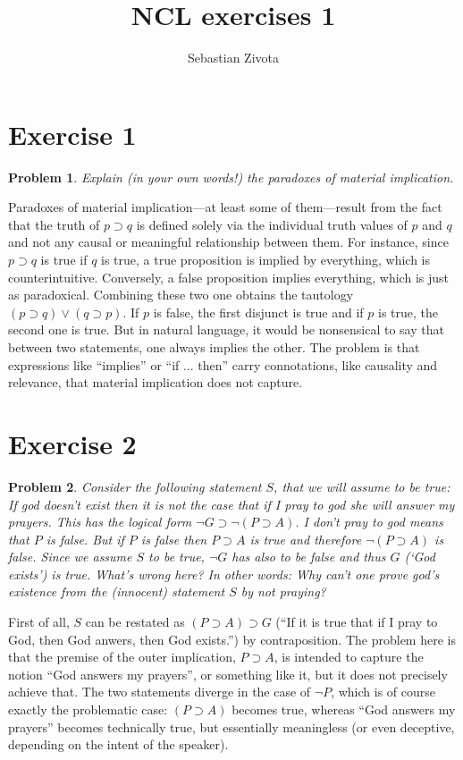 \documentclass[a4paper,10pt]{article}
\title{NCL exercises 1}
\author{Sebastian Zivota}
\newcommand{\imp}{\supset}
\newtheorem*{problem*}{Problem}
\theoremstyle{definition}
\begin{document}
\maketitle
\section*{Exercise 1}
\begin{problem*}
Explain (in your own words!) the paradoxes of material implication.
\end{problem*}
Paradoxes of material implication—at least some of them—result from the fact that the truth of $p \imp q$ is defined solely via the individual truth values of $p$ and $q$ and not any causal or meaningful relationship between them. For instance, since $p \imp q$ is true if $q$ is true, a true proposition is implied by everything, which is counterintuitive. Conversely, a false proposition implies everything, which is just as paradoxical. Combining these two one obtains the tautology $(p \imp q) ∨ (q \imp p)$. If $p$ is false, the first disjunct is true and if $p$ is true, the second one is true. But in natural language, it would be nonsensical to say that between two statements, one always implies the other. The problem is that expressions like ``implies'' or ``if ... then'' carry connotations, like causality and relevance, that material implication does not capture.

\section*{Exercise 2}
\begin{problem*}
Consider the following statement
$S$, that we will assume to be true:
\emph{If god doesn't exist then it is not the case that if I pray to god she will answer my prayers.}
This  has  the  logical  form $¬ G \imp ¬(P \imp A)$. I  don't  pray  to  god means  that $P$ is  false.   But  if $P$ is  false  then
$P \imp A$ is  true  and therefore $¬(P \imp A)$  is  false.   Since  we  assume $S$ to  be  true, $¬ G$ has also to be false and thus
$G$ (`God exists') is true.
What's  wrong  here?   In  other  words:  Why  can't  one  prove  god's existence from the (innocent) statement
$S$ by not praying?
\end{problem*}

First of all, $S$ can be restated as $(P \imp A) \imp G$ (``If it is true that if I pray to God, then God anwers, then God exists.'') by contraposition. The problem here is that the premise of the outer implication, $P \imp A$, is intended to capture the notion ``God answers my prayers'', or something like it, but it does not precisely achieve that. The two statements diverge in the case of $¬P$, which is of course exactly the problematic case: $(P \imp A)$ becomes true, whereas ``God answers my prayers'' becomes technically true, but essentially meaningless (or even deceptive, depending on the intent of the speaker).
\end{document}
